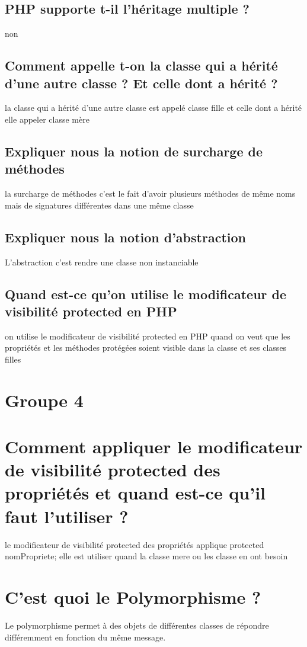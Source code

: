 \documentclass[12pt,b5paper]{article}
\begin{document}
\subsection{PHP supporte t-il l’héritage multiple ?}
non
\subsection{ Comment appelle t-on la classe qui a hérité d’une autre classe ? Et celle dont a hérité ?}
 la classe qui a hérité d’une autre classe est appelé classe fille et  celle dont a hérité elle appeler classe mère
\subsection{Expliquer nous la notion de surcharge de méthodes}
la surcharge de méthodes c'est le fait d'avoir plusieurs méthodes de même noms mais de signatures différentes dans une même classe 
\subsection{ Expliquer nous la notion d’abstraction}
L'abstraction c'est rendre une classe non instanciable 
\subsection{Quand est-ce qu’on utilise le modificateur de visibilité protected en PHP}
on utilise le modificateur de visibilité protected en PHP quand on veut que les propriétés et les méthodes protégées soient visible dans la classe et ses classes filles
\section{Groupe 4}

\section{Comment appliquer le modificateur de visibilité protected des propriétés et quand est-ce qu’il faut l’utiliser ?}
le modificateur de visibilité protected des propriétés applique protected nomPropriete; elle est utiliser quand la classe mere ou les classe en ont besoin
\section{C’est quoi le Polymorphisme ?}
Le polymorphisme permet à des objets de différentes classes de répondre différemment en fonction du même message.
\end{document}
